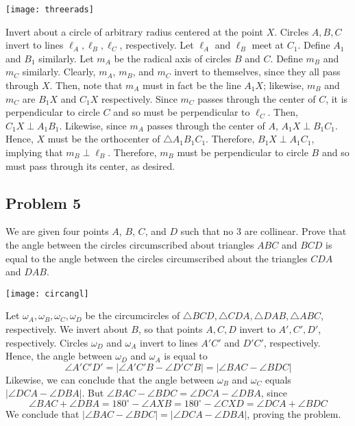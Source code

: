\begin{center}
    \texttt{[image: threerads]}
\end{center}

\begin{mdsoln}
Invert about a circle of arbitrary radius centered at the point $X$. Circles $A,B,C$ invert to lines $\ell_A,\ell_B,\ell_C$, respectively. Let $\ell_A$ and $\ell_B$ meet at $C_1$. Define $A_1$ and $B_1$ similarly. Let $m_A$ be the radical axis of circles $B$ and $C$. Define $m_B$ and $m_C$ similarly. Clearly, $m_A$, $m_B$, and $m_C$ invert to themselves, since they all pass through $X$. Then, note that $m_A$ must in fact be the line $A_1X$; likewise, $m_B$ and $m_C$ are $B_1X$ and $C_1X$ respectively. Since $m_C$ passes through the center of $C$, it is perpendicular to circle $C$ and so must be perpendicular to $\ell_C$. Then, $C_1X\perp A_1B_1$. Likewise, since $m_A$ passes through the center of $A$, $A_1X\perp B_1C_1$. Hence, $X$ must be the orthocenter of $\triangle A_1B_1C_1$. Therefore, $B_1X\perp A_1C_1$, implying that $m_B\perp \ell_B$. Therefore, $m_B$ must be perpendicular to circle $B$ and so must pass through its center, as desired.    
\end{mdsoln}

\subsection{Problem 5}
We are given four points $A$, $B$, $C$, and $D$ such that no 3 are collinear. Prove that the angle between the circles circumscribed about triangles $ABC$ and $BCD$ is equal to the angle between the circles circumscribed about the triangles $CDA$ and $DAB$.

\begin{center}
    \texttt{[image: circangl]}
\end{center}
\begin{mdsoln}
Let $\omega_A,\omega_B,\omega_C,\omega_D$ be the circumcircles of $\triangle BCD,\triangle CDA,\triangle DAB,\triangle ABC$, respectively. We invert about $B$, so that points $A,C,D$ invert to $A',C',D'$, respectively. Circles $\omega_D$ and $\omega_A$ invert to lines $A'C'$ and $D'C'$, respectively. Hence, the angle between $\omega_D$ and $\omega_A$ is equal to$$\angle A'C'D'=|\angle A'C'B -\angle D'C'B|=|\angle BAC-\angle BDC|$$
Likewise, we can conclude that the angle between $\omega_B$ and $\omega_C$ equals $|\angle DCA-\angle DBA|$. But $\angle BAC-\angle BDC=\angle DCA-\angle DBA$, since$$\angle BAC+\angle DBA=180^\circ-\angle AXB=180^\circ-\angle CXD=\angle DCA+\angle BDC$$We conclude that $|\angle BAC-\angle BDC|=|\angle DCA-\angle DBA|$, proving the problem.    
\end{mdsoln}

